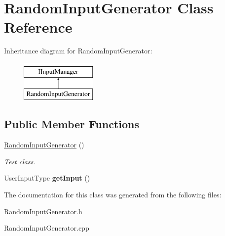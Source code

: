 \hypertarget{class_random_input_generator}{}\section{Random\+Input\+Generator Class Reference}
\label{class_random_input_generator}
Inheritance diagram for Random\+Input\+Generator\+:\begin{figure}[H]
\begin{center}
\leavevmode
\includegraphics[height=2.000000cm]{class_random_input_generator}
\end{center}
\end{figure}
\subsection*{Public Member Functions}
\begin{DoxyCompactItemize}
\item 
\mbox{\label{class_random_input_generator_afd6c995d37855154f296050304307ee4}} 
\mbox{\hyperlink{class_random_input_generator_afd6c995d37855154f296050304307ee4}{Random\+Input\+Generator}} ()
\begin{DoxyCompactList}\small\item\em Test class. \end{DoxyCompactList}\item 
\mbox{\label{class_random_input_generator_a519c2556c497b6b5ab521334d39749d9}} 
User\+Input\+Type {\bfseries get\+Input} ()
\end{DoxyCompactItemize}


The documentation for this class was generated from the following files\+:\begin{DoxyCompactItemize}
\item 
Random\+Input\+Generator.\+h\item 
Random\+Input\+Generator.\+cpp\end{DoxyCompactItemize}
